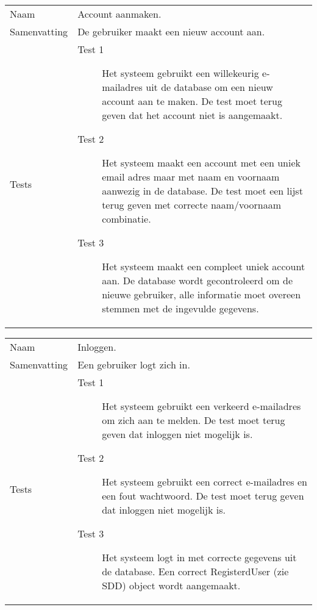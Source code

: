 \documentclass[a4paper]{article}
\begin{document}
\begin{longtable}{lp{10cm}}
Naam           & Account aanmaken.\\
Samenvatting   & De gebruiker maakt een nieuw account aan.\\
Tests   & 

\begin{description}

\item[Test 1] Het systeem gebruikt een willekeurig e-mailadres uit de database om een nieuw account aan te maken. De test moet terug geven dat het account niet is aangemaakt.
\item [Test 2] Het systeem maakt een account met een uniek email adres maar met naam en voornaam aanwezig in de database. De test moet een lijst terug geven met correcte naam/voornaam combinatie.
\item [Test 3] Het systeem maakt een compleet uniek account aan. De database wordt gecontroleerd om de nieuwe gebruiker, alle informatie moet overeen stemmen met de ingevulde gegevens.

\end{description}

\end{longtable}

\begin{longtable}{lp{10cm}}
Naam           & Inloggen.\\
Samenvatting   & Een gebruiker logt zich in.\\
Tests   & 

\begin{description}

\item[Test 1] Het systeem gebruikt een verkeerd e-mailadres om zich aan te melden. De test moet terug geven dat inloggen niet mogelijk is.
\item [Test 2] Het systeem gebruikt een correct e-mailadres en een fout wachtwoord. De test moet terug geven dat inloggen niet mogelijk is.
\item [Test 3] Het systeem logt in met correcte gegevens uit de database. Een correct RegisterdUser (zie SDD) object wordt aangemaakt.

\end{description}

\end{longtable}
\end{document}
